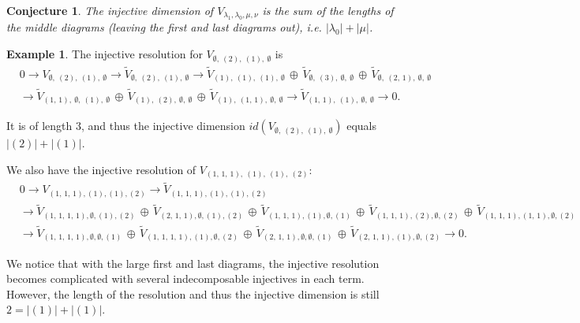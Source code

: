 \documentclass[openany, a4paper]{amsbook}
\newtheorem{conj}[thm]{Conjecture}
\theoremstyle{definition}
\newtheorem{exmp}[thm]{Example}
\numberwithin{equation}{chapter}
\begin{document}

\begin{conj}\label{injective dimension 1}
    The injective dimension of $V_{\lambda_1, \lambda_0, \mu, \nu}$ is the sum of the lengths of the middle diagrams (leaving the first and last diagrams out), i.e.  $\left\lvert\lambda_0 \right\rvert + \left\lvert\mu \right\rvert$.
\end{conj}

\begin{exmp}
    The injective resolution for $V_{ \emptyset, \ (2), \ (1), \ \emptyset }$ is 
    \begin{align*}
        & 0 \to 
        V_{ \emptyset, \ (2), \ (1), \ \emptyset }\to
        \tilde{V}_{ \emptyset, \ (2), \ (1), \ \emptyset }
        \to
        \tilde{V}_{ (1), \ (1), \ (1), \ \emptyset }\,\oplus\,\tilde{V}_{ \emptyset, \ (3), \ \emptyset, \ \emptyset }\,\oplus\,\tilde{V}_{ \emptyset, \ (2,\,1), \ \emptyset, \ \emptyset } \\ &
        \to 
        \tilde{V}_{ (1,\,1), \ \emptyset, \ (1), \ \emptyset }\,\oplus\,\tilde{V}_{ (1), \ (2), \ \emptyset, \ \emptyset }\,\oplus\,\tilde{V}_{ (1), \ (1,\,1), \ \emptyset, \ \emptyset }
        \to
        \tilde{V}_{ (1,\,1), \ (1), \ \emptyset, \ \emptyset }
        \to 0.
    \end{align*}

    It is of length 3, and thus the injective dimension $id(V_{ \emptyset, \ (2), \ (1), \ \emptyset })$ equals $\left\lvert (2) \right\rvert + \left\lvert (1) \right\rvert$. 

    We also have the injective resolution of  $V_{ (1,\,1,\,1), \ (1), \ (1), \ (2)}$:
    \begin{align*} 
        & 0 \to 
        V_{ (1,\,1,\,1),(1),(1),(2) }\to
        \tilde{V}_{ (1,\,1,\,1),(1),(1),(2) } \\ &
        \to
        \tilde{V}_{ (1,\,1,\,1,\,1),\emptyset,(1),(2) }\,\oplus\,\tilde{V}_{ (2,\,1,\,1),\emptyset,(1),(2) }\,\oplus\,\tilde{V}_{ (1,\,1,\,1),(1),\emptyset,(1) }\,\oplus\,\tilde{V}_{ (1,\,1,\,1),(2),\emptyset,(2) }\,\oplus\,\tilde{V}_{ (1,\,1,\,1),(1,\,1),\emptyset,(2) } \\&
        \to
        \tilde{V}_{ (1,\,1,\,1,\,1),\emptyset,\emptyset,(1) }\,\oplus\,\tilde{V}_{ (1,\,1,\,1,\,1),(1),\emptyset,(2) }\,\oplus\,\tilde{V}_{ (2,\,1,\,1),\emptyset,\emptyset,(1) }\,\oplus\,\tilde{V}_{ (2,\,1,\,1),(1),\emptyset,(2) }
        \to 0.
     \end{align*}

     We notice that with the large first and last diagrams, the injective resolution becomes complicated with several indecomposable injectives in each term. However, the length of the resolution and thus the injective dimension is still $2 =\left\lvert (1) \right\rvert + \left\lvert (1) \right\rvert$.
\end{exmp}
\end{document}
